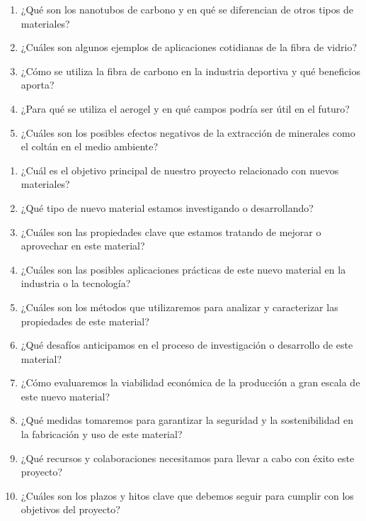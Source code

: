 \documentclass[../main]{subfiles}
\begin{document}
\begin{enumerate}
  \item ¿Qué son los nanotubos de carbono y en qué se diferencian de
    otros tipos de materiales?
  \item ¿Cuáles son algunos ejemplos de aplicaciones cotidianas de la
    fibra de vidrio?
  \item ¿Cómo se utiliza la fibra de carbono en la industria
    deportiva y qué beneficios aporta?
  \item ¿Para qué se utiliza el aerogel y en qué campos podría ser
    útil en el futuro?
  \item ¿Cuáles son los posibles efectos negativos de la extracción
    de minerales como el coltán en el medio ambiente?
\end{enumerate}

\begin{enumerate}
  \item ¿Cuál es el objetivo principal de nuestro proyecto
    relacionado con nuevos materiales?
  \item ¿Qué tipo de nuevo material estamos investigando o desarrollando?
  \item ¿Cuáles son las propiedades clave que estamos tratando de
    mejorar o aprovechar en este material?
  \item ¿Cuáles son las posibles aplicaciones prácticas de este nuevo
    material en la industria o la tecnología?
  \item ¿Cuáles son los métodos que utilizaremos para analizar y
    caracterizar las propiedades de este material?
  \item ¿Qué desafíos anticipamos en el proceso de investigación o
    desarrollo de este material?
  \item ¿Cómo evaluaremos la viabilidad económica de la producción a
    gran escala de este nuevo material?
  \item ¿Qué medidas tomaremos para garantizar la seguridad y la
    sostenibilidad en la fabricación y uso de este material?
  \item ¿Qué recursos y colaboraciones necesitamos para llevar a cabo
    con éxito este proyecto?
  \item ¿Cuáles son los plazos y hitos clave que debemos seguir para
    cumplir con los objetivos del proyecto?
\end{enumerate}
\end{document}
